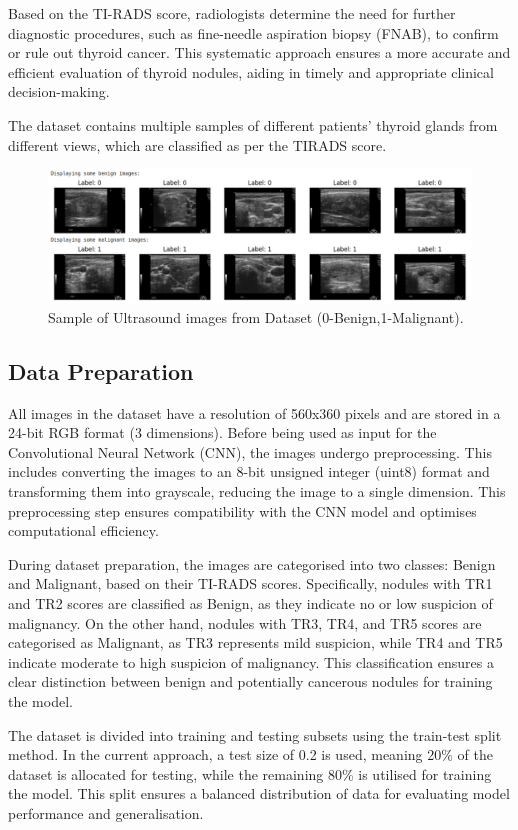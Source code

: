    \noindent
    Based on the TI-RADS score, radiologists determine the need for further diagnostic procedures, such as fine-needle aspiration biopsy (FNAB), to confirm or rule out thyroid cancer. This systematic approach ensures a more accurate and efficient evaluation of thyroid nodules, aiding in timely and appropriate clinical decision-making. \par \noindent
    \noindent The dataset contains multiple samples of different patients’ thyroid glands from different views, which are classified as per the TIRADS score.

    \begin{figure}[ht]
    \centering
    \includegraphics[width=\textwidth]{images/dataset.png}
    \caption{Sample of Ultrasound images from Dataset (0-Benign,1-Malignant).}
    \label{fig:thyroid_nodules}
\end{figure}
    \subsection{Data Preparation}
    \noindent
    All images in the dataset have a resolution of 560x360 pixels and are stored in a 24-bit RGB format (3 dimensions). Before being used as input for the Convolutional Neural Network (CNN), the images undergo preprocessing. This includes converting the images to an 8-bit unsigned integer (uint8) format and transforming them into grayscale, reducing the image to a single dimension. This preprocessing step ensures compatibility with the CNN model and optimises computational efficiency.
    \par \noindent During dataset preparation, the images are categorised into two classes: Benign and Malignant, based on their TI-RADS scores. Specifically, nodules with TR1 and TR2 scores are classified as Benign, as they indicate no or low suspicion of malignancy. On the other hand, nodules with TR3, TR4, and TR5 scores are categorised as Malignant, as TR3 represents mild suspicion, while TR4 and TR5 indicate moderate to high suspicion of malignancy. This classification ensures a clear distinction between benign and potentially cancerous nodules for training the model.
    \par \noindent The dataset is divided into training and testing subsets using the train-test split method. In the current approach, a test size of 0.2 is used, meaning 20\% of the dataset is allocated for testing, while the remaining 80\% is utilised for training the model. This split ensures a balanced distribution of data for evaluating model performance and generalisation.


